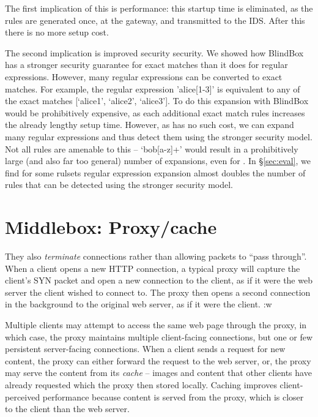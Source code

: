 The first implication of this is performance: this startup time is eliminated, as the rules are generated once, at the gateway, and transmitted to the IDS. After this there is no more setup cost.

The second implication is improved security security. We showed how BlindBox has a stronger security guarantee for exact matches than it does for regular expressions. However, many regular expressions can be converted to exact matches. 
For example, the regular expression 'alice[1-3]' is equivalent to any of the exact matches [`alice1', `alice2', `alice3'].
To do this expansion with BlindBox would be prohibitively expensive, as each additional exact match rules increases the already lengthy setup time.
However, as \sys has no such cost, we can expand many regular expressions and thus detect them using the stronger security model.
Not all rules are amenable to this -- \eg{} `bob[a-z]+' would result in a prohibitively large (and also far too general) number of expansions, even for \sys. 
In \S\ref{sec:eval}, we find for some rulsets regular expression expansion almost doubles the number of rules that can be detected using the stronger security model.


\section{Middlebox: Proxy/cache}\label{s:proxy}
They also {\it terminate} connections rather than allowing packets to ``pass through''.
When a client opens a new HTTP connection, a typical proxy will capture the client's SYN packet and open a new connection to the client, as if it were the web server the client wished to connect to. 
The proxy then opens a second connection in the background to the original web server, as if it were the client. :w

Multiple clients may attempt to access the same web page through the proxy, in which case, the proxy maintains multiple client-facing connections, but one or few persistent server-facing connections.
When a client sends a request for new content, the proxy can either forward the request to the web server, or, the proxy may serve the content from its {\it cache} -- images and content that other clients have already requested which the proxy then stored locally. 
Caching improves client-perceived performance because content is served from the proxy, which is closer to the client than the web server.

